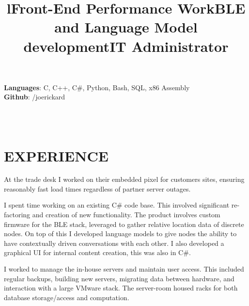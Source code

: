 \documentclass[margin]{res}
\begin{document}
\begin{resume}
\textbf{Languages}: C, C++, C\#, Python, Bash, SQL, x86 Assembly
\\
\textbf{Github}: /joerickard
\\

\begin{format}
\title{l}\\
\\
\body
\end{format}
\section{EXPERIENCE}

\title{\textbf{Front-End Performance Work}}
\begin{position}
At the trade desk I worked on their embedded pixel for customers sites, ensuring reasonably fast load times regardless of partner server outages.
\end{position}

\title{\textbf{BLE and Language Model development}}
\begin{position}
I spent time working on an existing C\# code base. This involved significant re-factoring and creation of new functionality. The product involves custom firmware for the BLE stack, leveraged to gather relative location data of discrete nodes. On top of this I developed language models to give nodes the ability to have contextually driven conversations with each other. I also developed a graphical UI for internal content creation, this was also in C\#.
\end{position}

\title{\textbf{IT Administrator}}
\begin{position}
I worked to manage the in-house servers and maintain user access. This included regular backups, building new servers, migrating data between hardware, and interaction with a large VMware stack. The server-room housed racks for both database storage/access and computation.
\end{position}


\end{resume}
\end{document}
